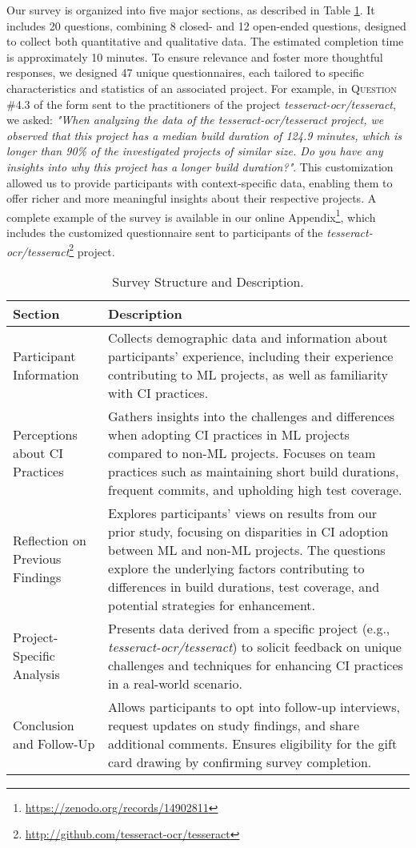 Our survey is organized into five major sections, as described in Table \ref{tab:survey_structure}. It includes 20 questions, combining 8 closed- and 12 open-ended questions, designed to collect both quantitative and qualitative data. The estimated completion time is approximately 10 minutes.
To ensure relevance and foster more thoughtful responses, we designed 47 unique questionnaires, each tailored to specific characteristics and statistics of an associated project.
For example, in \textsc{Question \#4.3} of the form sent to the practitioners of the project \textit{tesseract-ocr/tesseract}, we asked: \textit{"When analyzing the data of the \textit{tesseract-ocr/tesseract} project, we observed that this project has a median build duration of 124.9 minutes, which is longer than 90\% of the investigated projects of similar size. Do you have any insights into why this project has a longer build duration?"}.
This customization allowed us to provide participants with context-specific data, enabling them to offer richer and more meaningful insights about their respective projects.
A complete example of the survey is available in our online Appendix\footnote{\url{https://zenodo.org/records/14902811}}, which includes the customized questionnaire sent to participants of the \textit{tesseract-ocr/tesseract}\footnote{\url{http://github.com/tesseract-ocr/tesseract}} project.


\begin{table}
\centering
\caption{Survey Structure and Description.}
\label{tab:survey_structure}
\begin{tabular}{p{3cm}p{8cm}}
\toprule
\textbf{Section} & \textbf{Description} \\
\midrule
Participant Information & Collects demographic data and information about participants' experience, including their experience contributing to ML projects, as well as familiarity with CI practices. \\
\midrule
Perceptions about CI Practices & Gathers insights into the challenges and differences when adopting CI practices in ML projects compared to non-ML projects. Focuses on team practices such as maintaining short build durations, frequent commits, and upholding high test coverage. \\
\midrule
Reflection on Previous Findings & Explores participants' views on results from our prior study, focusing on disparities in CI adoption between ML and non-ML projects. The questions explore the underlying factors contributing to differences in build durations, test coverage, and potential strategies for enhancement. \\
\midrule
Project-Specific Analysis & Presents data derived from a specific project (e.g., \textit{tesseract-ocr/tesseract}) to solicit feedback on unique challenges and techniques for enhancing CI practices in a real-world scenario. \\
\midrule
Conclusion and Follow-Up & Allows participants to opt into follow-up interviews, request updates on study findings, and share additional comments. Ensures eligibility for the gift card drawing by confirming survey completion. \\
\bottomrule
\end{tabular}
\end{table}

